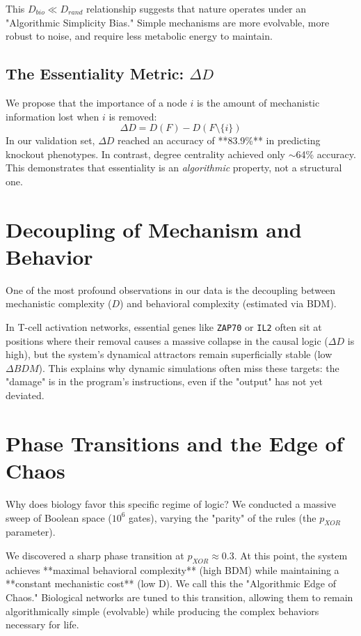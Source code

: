 \documentclass[10pt,twocolumn]{article}
\begin{document}
This $D_{bio} \ll D_{rand}$ relationship suggests that nature operates under an "Algorithmic Simplicity Bias." Simple mechanisms are more evolvable, more robust to noise, and require less metabolic energy to maintain.

\subsection{The Essentiality Metric: $\Delta D$}
We propose that the importance of a node $i$ is the amount of mechanistic information lost when $i$ is removed:
\begin{equation}
\Delta D = D(F) - D(F \setminus \{i\})
\end{equation}
In our validation set, $\Delta D$ reached an accuracy of **83.9\%** in predicting knockout phenotypes. In contrast, degree centrality achieved only $\sim$64\% accuracy. This demonstrates that essentiality is an \textit{algorithmic} property, not a structural one.

\section{Decoupling of Mechanism and Behavior}
One of the most profound observations in our data is the decoupling between mechanistic complexity ($D$) and behavioral complexity (estimated via BDM). 



In T-cell activation networks, essential genes like \texttt{ZAP70} or \texttt{IL2} often sit at positions where their removal causes a massive collapse in the causal logic ($\Delta D$ is high), but the system's dynamical attractors remain superficially stable (low $\Delta BDM$). This explains why dynamic simulations often miss these targets: the "damage" is in the program's instructions, even if the "output" has not yet deviated.

\section{Phase Transitions and the Edge of Chaos}
Why does biology favor this specific regime of logic? We conducted a massive sweep of Boolean space ($10^6$ gates), varying the "parity" of the rules (the $p_{XOR}$ parameter). 

We discovered a sharp phase transition at $p_{XOR} \approx 0.3$. At this point, the system achieves **maximal behavioral complexity** (high BDM) while maintaining a **constant mechanistic cost** (low D). We call this the "Algorithmic Edge of Chaos." Biological networks are tuned to this transition, allowing them to remain algorithmically simple (evolvable) while producing the complex behaviors necessary for life.
\end{document}
